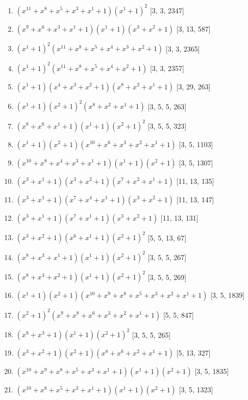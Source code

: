 \documentclass[10pt,twocolumn]{article}
\begin{document}
\begin{enumerate}
\item $(x^{11} + x^{8} + x^{5} + x^{3} + x^{1} + 1)(x^{1} + 1)^{2}$  [3, 3, 2347]
\item $(x^{9} + x^{6} + x^{3} + x^{1} + 1)(x^{1} + 1)(x^{3} + x^{2} + 1)$  [3, 13, 587]
\item $(x^{1} + 1)^{2}(x^{11} + x^{8} + x^{5} + x^{4} + x^{3} + x^{2} + 1)$  [3, 3, 2365]
\item $(x^{1} + 1)^{2}(x^{11} + x^{8} + x^{5} + x^{4} + x^{2} + 1)$  [3, 3, 2357]
\item $(x^{1} + 1)(x^{4} + x^{3} + x^{2} + 1)(x^{8} + x^{2} + x^{1} + 1)$  [3, 29, 263]
\item $(x^{1} + 1)(x^{2} + 1)^{2}(x^{8} + x^{2} + x^{1} + 1)$  [3, 5, 5, 263]
\item $(x^{8} + x^{6} + x^{1} + 1)(x^{1} + 1)(x^{2} + 1)^{2}$  [3, 5, 5, 323]
\item $(x^{1} + 1)(x^{2} + 1)(x^{10} + x^{6} + x^{3} + x^{2} + x^{1} + 1)$  [3, 5, 1103]
\item $(x^{10} + x^{8} + x^{4} + x^{3} + x^{1} + 1)(x^{1} + 1)(x^{2} + 1)$  [3, 5, 1307]
\item $(x^{3} + x^{1} + 1)(x^{3} + x^{2} + 1)(x^{7} + x^{2} + x^{1} + 1)$  [11, 13, 135]
\item $(x^{3} + x^{1} + 1)(x^{7} + x^{4} + x^{1} + 1)(x^{3} + x^{2} + 1)$  [11, 13, 147]
\item $(x^{3} + x^{1} + 1)(x^{7} + x^{1} + 1)(x^{3} + x^{2} + 1)$  [11, 13, 131]
\item $(x^{3} + x^{2} + 1)(x^{6} + x^{1} + 1)(x^{2} + 1)^{2}$  [5, 5, 13, 67]
\item $(x^{8} + x^{3} + x^{1} + 1)(x^{1} + 1)(x^{2} + 1)^{2}$  [3, 5, 5, 267]
\item $(x^{8} + x^{3} + x^{2} + 1)(x^{1} + 1)(x^{2} + 1)^{2}$  [3, 5, 5, 269]
\item $(x^{1} + 1)(x^{2} + 1)(x^{10} + x^{9} + x^{8} + x^{5} + x^{3} + x^{2} + x^{1} + 1)$  [3, 5, 1839]
\item $(x^{2} + 1)^{2}(x^{9} + x^{8} + x^{6} + x^{3} + x^{2} + x^{1} + 1)$  [5, 5, 847]
\item $(x^{8} + x^{3} + 1)(x^{1} + 1)(x^{2} + 1)^{2}$  [3, 5, 5, 265]
\item $(x^{3} + x^{2} + 1)(x^{2} + 1)(x^{8} + x^{6} + x^{2} + x^{1} + 1)$  [5, 13, 327]
\item $(x^{10} + x^{9} + x^{8} + x^{5} + x^{3} + x^{1} + 1)(x^{1} + 1)(x^{2} + 1)$  [3, 5, 1835]
\item $(x^{10} + x^{8} + x^{5} + x^{3} + x^{1} + 1)(x^{1} + 1)(x^{2} + 1)$  [3, 5, 1323]

\end{enumerate}
\end{document}
